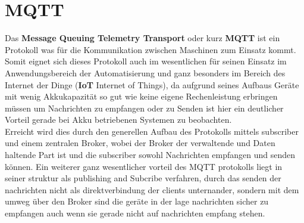 \section{MQTT}
Das \textbf{Message Queuing Telemetry Transport} oder kurz \textbf{MQTT} ist ein Protokoll was für die Kommunikation zwischen Maschinen zum Einsatz kommt. Somit eignet sich dieses Protokoll auch im wesentlichen für seinen Einsatz im Anwendungsbereich der Automatisierung und ganz besonders im Bereich des Internet der Dinge (\textbf{IoT} Internet of Things), da aufgrund seines Aufbaus Geräte mit wenig Akkukapazität so gut wie keine eigene Rechenleistung erbringen müssen um Nachrichten zu empfangen oder zu Senden ist hier ein deutlicher Vorteil gerade bei Akku betriebenen Systemen zu beobachten.\\
Erreicht wird dies durch den generellen Aufbau des Protokolls mittels subscriber und einem zentralen Broker, wobei der Broker der verwaltende und Daten haltende Part ist und die subscriber sowohl Nachrichten empfangen und senden können. Ein weiterer ganz wesentlicher vorteil des MQTT protokolls liegt in seiner struktur als publishing and Subcribe verfahren, durch das senden der nachrichten nicht als direktverbindung der clients unternander, sondern mit dem umweg über den Broker sind die geräte in der lage nachrichten sicher zu empfangen auch wenn sie gerade nicht auf nachrichten empfang stehen.\cite{b1}
